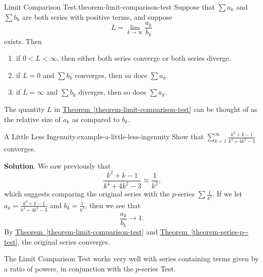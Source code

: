 \documentclass[10pt,]{book}
\numberwithin{equation}{section}
\newcommand{\lt}{<}
\begin{document}
\begin{theorem}{Limit Comparison Test.}{}{theorem-limit-comparison-test}%
\hypertarget{p-888}{}%
Suppose that \(\sum a_{k}\) and \(\sum b_{k}\) are both series with positive terms, and suppose%
\begin{equation*}
L = \lim_{k\to\infty}\frac{a_{k}}{b_{k}}
\end{equation*}
exists. Then \leavevmode%
\begin{enumerate}
\item\hypertarget{li-96}{}\hypertarget{p-889}{}%
if \(0 \lt L \lt \infty\), then either both series converge or both series diverge.%
\item\hypertarget{li-97}{}\hypertarget{p-890}{}%
if \(L = 0\) and \(\sum b_{k}\) converges, then so does \(\sum a_{k}\).%
\item\hypertarget{li-98}{}\hypertarget{p-891}{}%
if \(L = \infty\) and \(\sum b_{k}\) diverges, then so does \(\sum a_{k}\).%
\end{enumerate}
%
\end{theorem}
\hypertarget{p-892}{}%
The quantity \(L\) in \hyperref[theorem-limit-comparison-test]{Theorem~\ref{theorem-limit-comparison-test}} can be thought of as the relative size of \(a_{k}\) as compared to \(b_{k}\).%
\begin{example}{A Little Less Ingenuity.}{example-a-little-less-ingenuity}%
\hypertarget{p-893}{}%
Show that \(\sum_{k=1}^{\infty}\frac{k^{2} + k - 1}{k^{4} + 4k^{2} - 3}\) converges.%
\par\smallskip%
\noindent\textbf{Solution}.\hypertarget{solution-183}{}\quad%
\hypertarget{p-894}{}%
We saw previously that%
\begin{equation*}
\frac{k^{2} + k - 1}{k^{4} + 4k^{2} - 3} \approx \frac{1}{k^{2}}\text{,}
\end{equation*}
which suggests comparing the original series with the \(p\)-series \(\sum\frac{1}{k^{2}}\). If we let \(a_{k} = \frac{k^{2} + k - 1}{k^{4} + 4k^{2} - 3}\) and \(b_{k} = \frac{1}{k^{2}}\), then we see that%
\begin{equation*}
\frac{a_{k}}{b_{k}} \to 1\text{.}
\end{equation*}
By \hyperref[theorem-limit-comparison-test]{Theorem~\ref{theorem-limit-comparison-test}} and \hyperref[theorem-series-p--test]{Theorem~\ref{theorem-series-p--test}}, the original series converges.%
\end{example}
\hypertarget{p-895}{}%
The Limit Comparison Test works very well with series containing terms given by a ratio of powers, in conjunction with the \(p\)-series Test.%
\end{document}
